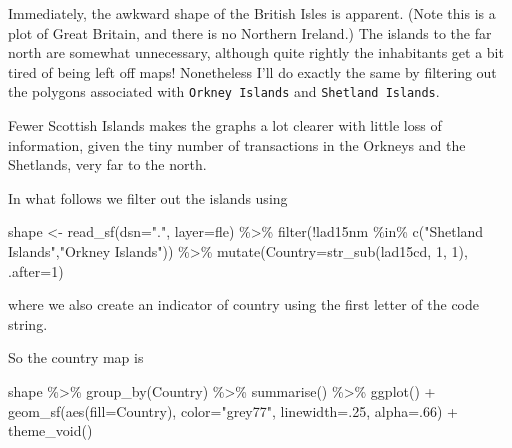 \documentclass[
  letterpaper,
]{book}
\newenvironment{Shaded}{\begin{snugshade}}{\end{snugshade}}
\newcommand{\AttributeTok}[1]{\textcolor[rgb]{0.40,0.45,0.13}{#1}}
\newcommand{\DecValTok}[1]{\textcolor[rgb]{0.68,0.00,0.00}{#1}}
\newcommand{\FunctionTok}[1]{\textcolor[rgb]{0.28,0.35,0.67}{#1}}
\newcommand{\NormalTok}[1]{\textcolor[rgb]{0.00,0.23,0.31}{#1}}
\newcommand{\OtherTok}[1]{\textcolor[rgb]{0.00,0.23,0.31}{#1}}
\newcommand{\SpecialCharTok}[1]{\textcolor[rgb]{0.37,0.37,0.37}{#1}}
\newcommand{\StringTok}[1]{\textcolor[rgb]{0.13,0.47,0.30}{#1}}
\begin{document}
Immediately, the awkward shape of the British Isles is apparent. (Note
this is a plot of Great Britain, and there is no Northern Ireland.) The
islands to the far north are somewhat unnecessary, although quite
rightly the inhabitants get a bit tired of being left off maps!
Nonetheless I'll do exactly the same by filtering out the polygons
associated with \texttt{Orkney\ Islands} and \texttt{Shetland\ Islands}.

Fewer Scottish Islands makes the graphs a lot clearer with little loss
of information, given the tiny number of transactions in the Orkneys and
the Shetlands, very far to the north.

In what follows we filter out the islands using

\begin{Shaded}
\begin{Highlighting}[]
\NormalTok{shape }\OtherTok{\textless{}{-}} \FunctionTok{read\_sf}\NormalTok{(}\AttributeTok{dsn=}\StringTok{"."}\NormalTok{, }\AttributeTok{layer=}\NormalTok{fle) }\SpecialCharTok{\%\textgreater{}\%}
  \FunctionTok{filter}\NormalTok{(}\SpecialCharTok{!}\NormalTok{lad15nm }\SpecialCharTok{\%in\%} \FunctionTok{c}\NormalTok{(}\StringTok{"Shetland Islands"}\NormalTok{,}\StringTok{"Orkney Islands"}\NormalTok{)) }\SpecialCharTok{\%\textgreater{}\%}
  \FunctionTok{mutate}\NormalTok{(}\AttributeTok{Country=}\FunctionTok{str\_sub}\NormalTok{(lad15cd, }\DecValTok{1}\NormalTok{, }\DecValTok{1}\NormalTok{), }\AttributeTok{.after=}\DecValTok{1}\NormalTok{)}
\end{Highlighting}
\end{Shaded}

where we also create an indicator of country using the first letter of
the code string.

So the country map is

\begin{Shaded}
\begin{Highlighting}[]
\NormalTok{shape }\SpecialCharTok{\%\textgreater{}\%}
  \FunctionTok{group\_by}\NormalTok{(Country) }\SpecialCharTok{\%\textgreater{}\%}
  \FunctionTok{summarise}\NormalTok{() }\SpecialCharTok{\%\textgreater{}\%}
  \FunctionTok{ggplot}\NormalTok{() }\SpecialCharTok{+}
  \FunctionTok{geom\_sf}\NormalTok{(}\FunctionTok{aes}\NormalTok{(}\AttributeTok{fill=}\NormalTok{Country), }\AttributeTok{color=}\StringTok{"grey77"}\NormalTok{, }\AttributeTok{linewidth=}\NormalTok{.}\DecValTok{25}\NormalTok{, }\AttributeTok{alpha=}\NormalTok{.}\DecValTok{66}\NormalTok{) }\SpecialCharTok{+}
  \FunctionTok{theme\_void}\NormalTok{()}
\end{Highlighting}
\end{Shaded}
\end{document}
